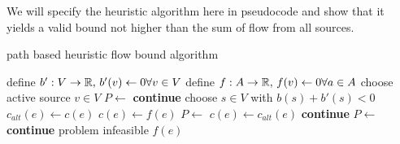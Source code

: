 We will specify the heuristic algorithm here in pseudocode and show that it yields a valid bound not higher than the 
sum of flow from all sources. %

\begin{algorithm}
 \caption{path based heuristic flow bound algorithm}
\label{algo:pathHeur}
 \begin{algorithmic}[5]%
    \State define $b':V\to \mathbb{R},\, b'(v)\gets 0 \forall v\in V$ 
    \State define $f: A\to\mathbb{R},\, f(v)\gets 0 \forall a\in A$
      \State choose active source $v\in V$ 
	\State $P\gets $
	  \State {}\label{heur:lineAugCase1}
	  \State \textbf{continue}
	\EndIf
      \EndIf
	\State choose $s\in V$ with $b(s)+b'(s)<0$
	\State $c_{alt}(e)\gets c(e)$
	\State $c(e)\gets f(e)$
	\State $P\gets$
	\State $c(e)\gets c_{alt}(e)$
	  \State {}\label{heur:lineAugCase2}
	  \State \textbf{continue}
	\Else
	  \State $P\gets$ 
	    \State {}\label{heur:lineAugCase3}
	    \State \textbf{continue}
	  \Else
	    \State \Return problem infeasible
	  \EndIf
	\EndIf
    \EndWhile
    \State \Return $f(e)$
  \EndFunction
 \end{algorithmic}

\end{algorithm}

